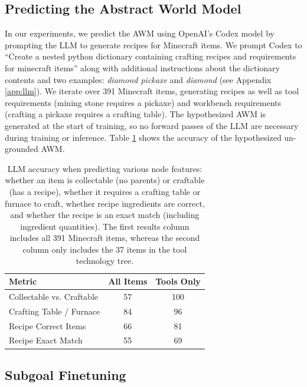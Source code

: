 \documentclass[nohyperref]{article}
\theoremstyle{plain}
\theoremstyle{definition}
\theoremstyle{remark}
\begin{document}
\subsection{Predicting the Abstract World Model}
\label{sec:subllm}

In our experiments,  we predict the AWM using OpenAI's Codex model \cite{OpenAICodex} by prompting the LLM to generate recipes for Minecraft items. 
We prompt Codex to ``Create a nested python dictionary containing crafting recipes and requirements for minecraft items'' along with additional instructions about the dictionary contents and two examples: \emph{diamond pickaxe} and \emph{diamond} (see Appendix \ref{app:llm}).
We iterate over 391 Minecraft items, generating recipes as well as tool requirements (mining stone requires a pickaxe) and workbench requirements (crafting a pickaxe requires a crafting table).
The hypothesized AWM is generated at the start of training, so no forward passes of the LLM are necessary during training or inference.
Table \ref{tab:llm} shows the accuracy of the hypothesized un-grounded AWM.

\begin{table}[h]
    \small
    \setlength{\tabcolsep}{2.75pt}
    \center
    \begin{tabular}{lcc}
        Metric                   & All Items & Tools Only \\
        \midrule
        Collectable vs. Craftable& 57      & 100   \\
        Crafting Table / Furnace & 84      & 96  \\
        Recipe Correct Items     & 66      & 81  \\
        Recipe Exact Match       & 55      & 69 
    \end{tabular}
    \caption{
    LLM accuracy when predicting various node features: whether an item is collectable (no parents) or craftable (has a recipe), whether it requires a crafting table or furnace to craft, whether recipe ingredients are correct, and whether the recipe is an exact match (including ingredient quantities). The first results column includes all 391 Minecraft items, whereas the second column only includes the 37 items in the tool technology tree.}
    \label{tab:llm}
\end{table}

\subsection{Subgoal Finetuning}
\label{sec:finetuning}
\end{document}
